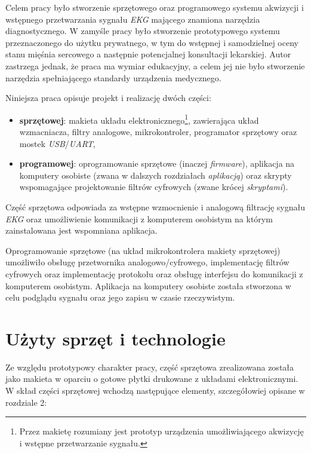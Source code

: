 Celem pracy było stworzenie sprzętowego oraz programowego systemu akwizycji i wstępnego przetwarzania sygnału \textit{EKG} 
mającego znamiona narzędzia diagnostycznego. W zamyśle pracy było stworzenie prototypowego systemu przeznaczonego 
do użytku prywatnego, w tym do wstępnej i samodzielnej oceny stanu mięśnia sercowego a następnie
potencjalnej konsultacji lekarskiej.  
Autor zastrzega jednak, że praca ma wymiar edukacyjny, a celem jej nie było stworzenie narzędzia spełniającego 
standardy urządzenia medycznego.


Niniejsza praca opisuje projekt i realizację dwóch części:

\begin{itemize}

    \item \textbf{sprzętowej}: makieta układu elektronicznego\footnote{Przez makietę rozumiany jest prototyp urządzenia umożliwiającego akwizycję i wstępne przetwarzanie sygnału. }, zawierająca układ wzmacniacza, filtry analogowe, 
    mikrokontroler, programator sprzętowy oraz mostek \textit{USB}/\textit{UART},


    \item \textbf{programowej}: oprogramowanie sprzętowe (inaczej \textit{firmware}), aplikacja na komputery osobiste 
    (zwana w dalszych rozdziałach \textit{aplikacją}) oraz skrypty wspomagające projektowanie filtrów cyfrowych 
    (zwane krócej \textit{skryptami}).

\end{itemize}

Część sprzętowa odpowiada za wstępne wzmocnienie i analogową filtrację sygnału \textit{EKG} 
oraz umożliwienie komunikacji z komputerem osobistym na którym zainstalowana jest wspomniana aplikacja. 


Oprogramowanie sprzętowe (na układ mikrokontrolera makiety sprzętowej) umożliwiło obsługę przetwornika analogowo/cyfrowego,
implementację filtrów cyfrowych oraz implementację protokołu oraz obsługę interfejsu do komunikacji z komputerem osobistym.
Aplikacja na komputery osobiste została stworzona w celu podglądu sygnału oraz jego zapisu w czasie rzeczywistym.

\newpage

\section*{Użyty sprzęt i technologie}

Ze względu prototypowy charakter pracy, część sprzętowa zrealizowana została jako makieta w oparciu o gotowe
płytki drukowane z układami elektronicznymi. W skład części sprzętowej wchodzą następujące elementy, szczegółowiej
opisane w rozdziale 2:

